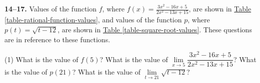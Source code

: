 \documentclass[10pt,oneside,]{book}
\theoremstyle{plain}
\theoremstyle{definition}
\numberwithin{equation}{section}
\newcommand{\hrulemedium}{\noalign{\hrule height 0.07em}}
\newcommand{\hrulethick} {\noalign{\hrule height 0.11em}}
\newcounter{figstack}
\newcounter{figindex}
\newlength\fight
\newcommand\pushValignCaptionBottom[5][b]{%
\stepcounter{figstack}%
\expandafter\def\csname %
figalign\romannumeral\value{figstack}\endcsname{#1}%
\expandafter\def\csname %
figtype\romannumeral\value{figstack}\endcsname{#2}%
\expandafter\def\csname %
figwd\romannumeral\value{figstack}\endcsname{#3}%
\expandafter\def\csname %
figcontent\romannumeral\value{figstack}\endcsname{#4}%
\expandafter\def\csname %
figcap\romannumeral\value{figstack}\endcsname{#5}%
\setbox0=\hbox{%
\begin{#2}{#3}#4\end{#2}}%
\ifdim\dimexpr\ht0+\dp0\relax>\fight\global\setlength{\fight}{%
\dimexpr\ht0+\dp0\relax}\fi%
}
\newcommand\popValignCaptionBottom{%
\setcounter{figindex}{0}%
\hfill%
\whiledo{\value{figindex}<\value{figstack}}{%
\stepcounter{figindex}%
\def\tmp{\csname figwd\romannumeral\value{figindex}\endcsname}%
\begin{\csname figtype\romannumeral\value{figindex}\endcsname}[t]{\tmp}%
\centering%
\stackinset{c}{}%
{\csname figalign\romannumeral\value{figindex}\endcsname}{}%
{\csname figcontent\romannumeral\value{figindex}\endcsname}%
{\rule{0pt}{\fight}}\par%
\csname figcap\romannumeral\value{figindex}\endcsname%
\end{\csname figtype\romannumeral\value{figindex}\endcsname}%
\hfill%
}%
\setcounter{figstack}{0}%
\setlength{\fight}{0pt}%
\hfill%
}
\newcommand{\fe}[2]{#1\mathopen{}\left(#2\right)\mathclose{}}
\begin{document}
\par\smallskip\noindent
\textbf{14--17. }\hypertarget{exercisegroup-14}{\null}Values of the function \(f\), where \(\fe{f}{x}=\frac{3x^2-16x+5}{2x^2-13x+15}\), are shown in \hyperref[table-rational-function-values]{Table \ref{table-rational-function-values}}, and values of the function \(p\), where \(\fe{p}{t}=\sqrt{t-12}\), are shown in \hyperref[table-square-root-values]{Table \ref{table-square-root-values}}. These questions are in reference to these functions.%
\par
\begin{exercisegroup}(1)
\exercise[14.]\hypertarget{exercise-59}{\null}What is the value of \(\fe{f}{5}\)?%
\exercise[15.]\hypertarget{exercise-60}{\null}What is the value of \(\lim\limits_{x\to5}\dfrac{3x^2-16x+5}{2x^2-13x+15}\)?%
\exercise[16.]\hypertarget{exercise-61}{\null}What is the value of \(\fe{p}{21}\)?%
\exercise[17.]\hypertarget{exercise-62}{\null}What is the value of \(\lim\limits_{t\to21}\sqrt{t-12}\)?%
\end{exercisegroup}
\end{document}
